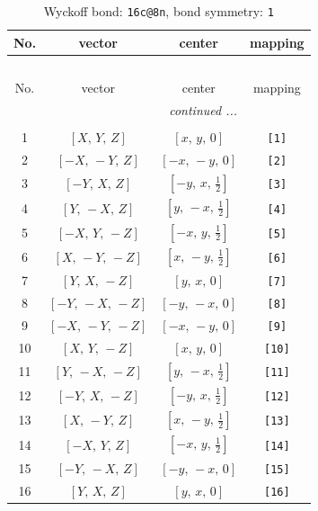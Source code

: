 \documentclass[fleqn,8pt]{jsarticle}
\begin{document}
\begin{longtable}{cccc}
\caption{Wyckoff bond: {\tt 16c@8n}, bond symmetry: {\tt 1}}
 \\
 \hline \hline
No. & vector & center & mapping \\ \hline \endfirsthead

\multicolumn{3}{l}{\tablename\ \thetable{}} \\
 \hline \hline
No. & vector & center & mapping \\ \hline \endhead

 \hline \hline
\multicolumn{3}{r}{\footnotesize\it continued ...} \\ \endfoot

 \hline \hline
\multicolumn{3}{r}{} \\ \endlastfoot

1 & $\left[ X,\, Y,\, Z \right]$ & $\left[ x,\, y,\, 0 \right]$ & {\tt [1]} \\ \hline
2 & $\left[ - X,\, - Y,\, Z \right]$ & $\left[ - x,\, - y,\, 0 \right]$ & {\tt [2]} \\ \hline
3 & $\left[ - Y,\, X,\, Z \right]$ & $\left[ - y,\, x,\, \frac{1}{2} \right]$ & {\tt [3]} \\ \hline
4 & $\left[ Y,\, - X,\, Z \right]$ & $\left[ y,\, - x,\, \frac{1}{2} \right]$ & {\tt [4]} \\ \hline
5 & $\left[ - X,\, Y,\, - Z \right]$ & $\left[ - x,\, y,\, \frac{1}{2} \right]$ & {\tt [5]} \\ \hline
6 & $\left[ X,\, - Y,\, - Z \right]$ & $\left[ x,\, - y,\, \frac{1}{2} \right]$ & {\tt [6]} \\ \hline
7 & $\left[ Y,\, X,\, - Z \right]$ & $\left[ y,\, x,\, 0 \right]$ & {\tt [7]} \\ \hline
8 & $\left[ - Y,\, - X,\, - Z \right]$ & $\left[ - y,\, - x,\, 0 \right]$ & {\tt [8]} \\ \hline
9 & $\left[ - X,\, - Y,\, - Z \right]$ & $\left[ - x,\, - y,\, 0 \right]$ & {\tt [9]} \\ \hline
10 & $\left[ X,\, Y,\, - Z \right]$ & $\left[ x,\, y,\, 0 \right]$ & {\tt [10]} \\ \hline
11 & $\left[ Y,\, - X,\, - Z \right]$ & $\left[ y,\, - x,\, \frac{1}{2} \right]$ & {\tt [11]} \\ \hline
12 & $\left[ - Y,\, X,\, - Z \right]$ & $\left[ - y,\, x,\, \frac{1}{2} \right]$ & {\tt [12]} \\ \hline
13 & $\left[ X,\, - Y,\, Z \right]$ & $\left[ x,\, - y,\, \frac{1}{2} \right]$ & {\tt [13]} \\ \hline
14 & $\left[ - X,\, Y,\, Z \right]$ & $\left[ - x,\, y,\, \frac{1}{2} \right]$ & {\tt [14]} \\ \hline
15 & $\left[ - Y,\, - X,\, Z \right]$ & $\left[ - y,\, - x,\, 0 \right]$ & {\tt [15]} \\ \hline
16 & $\left[ Y,\, X,\, Z \right]$ & $\left[ y,\, x,\, 0 \right]$ & {\tt [16]} \\
\end{longtable}
\end{document}
